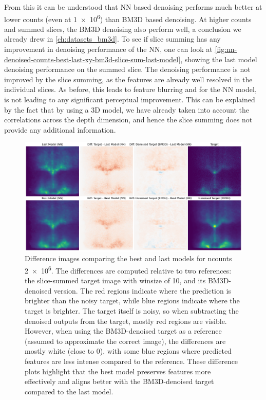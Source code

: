 From this it can be understood that \gls{NN} based denoising performs much better at lower counts (even at \num{1e6}) than BM3D based denoising. At higher counts and summed slices, the BM3D denoising also perform well, a conclusion we already drew in \cref{ch:datasets_bm3d}. To see if slice summing has any improvement in denoising performance of the \gls{NN}, one can look at  \cref{fig:nn-denoised-counts-best-last-xy-bm3d-slice-sum-last-model}, showing the last model denoising performance on the summed slice. The denoising performance is not improved by the slice summing, as the features are already well resolved in the individual slices. As before, this leads to feature blurring and for the \gls{NN} model, is not leading to any significant perceptual improvement. This can be explained by the fact that by using a 3D model, we have already taken into account the correlations across the depth dimension, and hence the slice summing does not provide any additional information.

\begin{figure}
    \centering
    \includegraphics[width=1\linewidth]{images/nn_diff_plots_2M.pdf}
    \caption{Difference images comparing the best and last models for \gls{ncounts} \num{2e6}. The differences are computed relative to two references: the slice-summed target image with \gls{winsize} of \num{10}, and its BM3D-denoised version. The red regions indicate where the prediction is brighter than the noisy target, while blue regions indicate where the target is brighter. The target itself is noisy, so when subtracting the denoised outputs from the target, mostly red regions are visible. However, when using the BM3D-denoised target as a reference (assumed to approximate the correct image), the differences are mostly white (close to 0), with some blue regions where predicted features are less intense compared to the reference. These difference plots highlight that the best model preserves features more effectively and aligns better with the BM3D-denoised target compared to the last model.}
    \label{fig:nn_diff_plots_2M} 
\end{figure}

